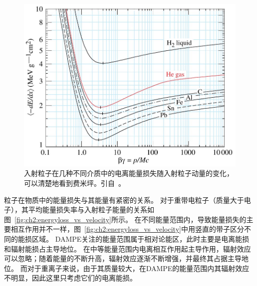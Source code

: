\begin{figure}[h!]
	\centering
	\includegraphics[width=0.8\linewidth]{chap/description/fig/fermi_plateau}
	\caption{入射粒子在几种不同介质中的电离能量损失随入射粒子动量的变化，可以清楚地看到费米坪。引自~\parencite{pdg_book}。}
	\label{fig:ch2:fermi_plateau}
\end{figure}

粒子在物质中的能量损失与其能量有紧密的关系。
对于重带电粒子（质量大于电子），其平均能量损失率与入射粒子能量的关系如图~\ref{fig:ch2:energyloss_vs_velocity}所示。
在不同能量范围内，导致能量损失的主要相互作用并不一样，图~\ref{fig:ch2:energyloss_vs_velocity}中用竖直的带子区分不同的能损区域。
DAMPE关注的能量范围属于相对论能区，此时主要是电离能损和辐射能损占主导地位。
在中等能量范围内电离相互作用起主导作用，辐射效应可以忽略；随着能量的不断升高，辐射效应逐渐不断增强，并最终其占据主导地位。
而对于重离子来说，由于其质量较大，在DAMPE的能量范围内其辐射效应不明显，因此这里只考虑它们的电离能损。

